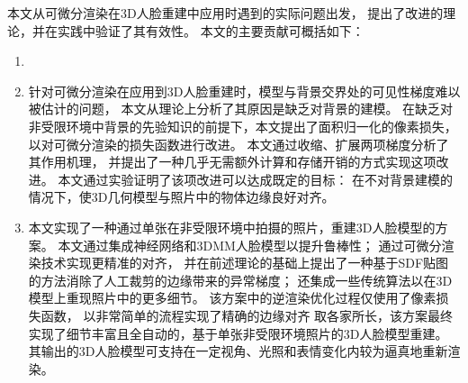 本文从可微分渲染在3D人脸重建中应用时遇到的实际问题出发，
提出了改进的理论，并在实践中验证了其有效性。
本文的主要贡献可概括如下：

\begin{enumerate}
\item {}

\item 针对可微分渲染在应用到3D人脸重建时，模型与背景交界处的可见性梯度难以被估计的问题，
本文从理论上分析了其原因是缺乏对背景的建模。
在缺乏对非受限环境中背景的先验知识的前提下，本文提出了面积归一化的像素损失，
以对可微分渲染的损失函数进行改进。
本文通过收缩、扩展两项梯度分析了其作用机理，
并提出了一种几乎无需额外计算和存储开销的方式实现这项改进。
本文通过实验证明了该项改进可以达成既定的目标：
在不对背景建模的情况下，使3D几何模型与照片中的物体边缘良好对齐。

\item 本文实现了一种通过单张在非受限环境中拍摄的照片，重建3D人脸模型的方案。
本文通过集成神经网络和3DMM人脸模型以提升鲁棒性；
通过可微分渲染技术实现更精准的对齐，
并在前述理论的基础上提出了一种基于SDF贴图的方法消除了人工裁剪的边缘带来的异常梯度；
还集成一些传统算法以在3D模型上重现照片中的更多细节。
该方案中的逆渲染优化过程仅使用了像素损失函数，
以非常简单的流程实现了精确的边缘对齐
取各家所长，该方案最终实现了细节丰富且全自动的，基于单张非受限环境照片的3D人脸模型重建。
其输出的3D人脸模型可支持在一定视角、光照和表情变化内较为逼真地重新渲染。

\end{enumerate}

